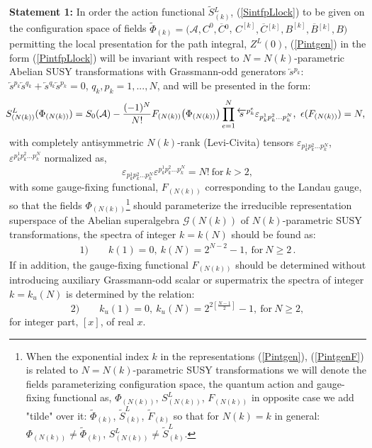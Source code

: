 \documentclass[10pt]{article}
\begin{document}
\noindent
\textbf{Statement 1:} In order  the action functional $\widetilde{S}{}^L_{(k)}$, (\ref{SintfpLlock}) to be given on the configuration space of fields $\widetilde{\Phi}_{(k)}=(\mathcal{A}, C^0, \overline{C}{}^0$,  $C^{[k]}, \overline{C}{}^{[k]}, B^{[k]}, \overline{B}{}^{[k]}, B)$ permitting the local presentation for the path integral, $Z^L(0)$, (\ref{Pintgen}) in the form  (\ref{PintfpLlock})  will be invariant with respect to $N=N(k)$-parametric Abelian SUSY transformations with Grassmann-odd  generators $\overleftarrow{s}{}^{p_k}$: $\overleftarrow{s}{}^{p_k}\overleftarrow{s}{}^{q_k}+\overleftarrow{s}{}^{q_k}\overleftarrow{s}{}^{p_k}=0$,   $q_k,p_k=1,...,N$, and will be presented in the form:
\begin{eqnarray}
   &\hspace{-0.8em}& \hspace{-0.7em} S^L_{(N(k))}(\Phi_{(N(k))}) = S_0(\mathcal{A})- \frac{(-1)^N}{N!} F_{(N(k))}\big(\Phi_{(N(k))}\big)\prod_{e=1}^N\overleftarrow{s}{}^{p^e_k}\varepsilon_{p^1_kp^2_k\ldots p^N_k}, \ \epsilon( F_{(N(k))})=N \label{qe}, \end{eqnarray}
with completely antisymmetric $N(k)$-rank (Levi-Civita)  tensors $\varepsilon_{p^1_kp^2_k\ldots p^N_k}$, $\varepsilon^{p^1_kp^2_k\ldots p^N_k}$ normalized as,
  \begin{equation}\label{lchevn}
 \varepsilon_{p^1_kp^2_k\ldots p^N_k}\varepsilon^{p^1_kp^2_k\ldots p^N_k} = N! \ \mathrm{for}  \ k>2,
\end{equation}
with some gauge-fixing functional,  $F_{(N(k))}$ corresponding to the Landau gauge, so that the fields $\Phi_{(N(k))}$\footnote{When the exponential index $k$ in the representations (\ref{Pintgen}), (\ref{PintgenF}) is related to $N=N(k)$-parametric SUSY transformations we will  denote  the fields parameterizing configuration space, the quantum action and gauge-fixing functional as, $\Phi_{(N(k))}$, $S^L_{(N(k))}$, $F_{(N(k))}$ in opposite case we add "tilde" over it: $\widetilde{\Phi}_{(k)}$, $\widetilde{S}^L_{(k)}$, $\widetilde{F}_{(k)}$ so that for $N(k)=k$ in general: $\Phi_{(N(k))}\ne  \widetilde{\Phi}_{(k)}$, $S^L_{(N(k))} \ne \widetilde{S}^L_{(k)}$.} should  parameterize   the  irreducible representation superspace of   the Abelian superalgebra $\mathcal{G}(N(k))$ of $N(k)$-parametric  SUSY transformations,
the spectra of integer $k=k(N)$ should be found as:
\begin{eqnarray}\label{kN}
1) \qquad k(1) =0,\   k(N) = 2^{N-2}-1, \ \mathrm{for} \ N\geq 2\,.
\end{eqnarray}
If in addition, the gauge-fixing functional $F_{(N(k))}$ should be determined without introducing auxiliary  Grassmann-odd scalar or supermatrix the spectra of integer $k=k_u(N)$  is determined by the relation:
\begin{equation}\label{kNu}
2) \qquad k_u(1) =0,\   k_u(N) = 2^{2\left[\frac{N-1}{2}\right]}-1, \ \mathrm{for} \ N\geq 2,
\end{equation}
 for integer part, $[x]$, of real $x$.
\end{document}
